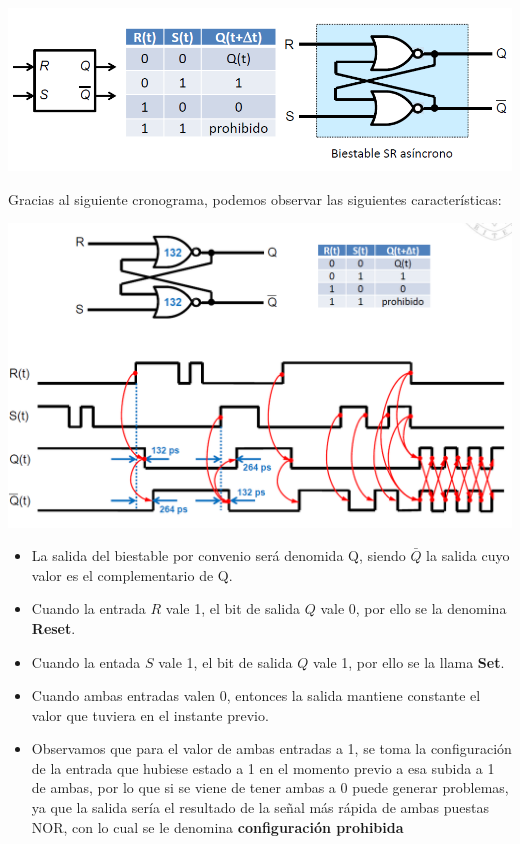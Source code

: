 \documentclass[a4paper,10pt]{book}
\begin{document}
\begin{center}
\includegraphics[scale=0.5]{biestable RS asincrono}
\end{center}

Gracias al siguiente cronograma, podemos observar las siguientes características:

\begin{center}
\includegraphics[scale=0.5]{cronograma RS asincrono}
\end{center}

\begin{itemize}
\item La salida del biestable por convenio será denomida Q, siendo $\bar{Q}$ la salida cuyo valor es el complementario de Q.

\item Cuando la entrada $R$ vale 1, el bit de salida $Q$ vale 0, por ello se la denomina \textbf{Reset}.

\item Cuando la entada $S$ vale 1, el bit de salida $Q$ vale 1, por ello se la llama \textbf{Set}.

\item Cuando ambas entradas valen 0, entonces la salida mantiene constante el valor que tuviera en el instante previo.

\item Observamos que para el valor de ambas entradas a 1, se toma la configuración de la entrada que hubiese estado a 1 en el momento previo a esa subida a 1 de ambas, por lo que si se viene de tener ambas a 0 puede generar problemas, ya que la salida sería el resultado de la señal más rápida de ambas puestas NOR, con lo cual se le denomina \textbf{configuración prohibida} 
\end{itemize}
\end{document}
